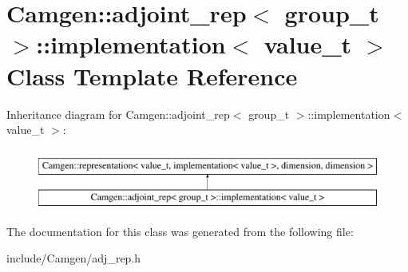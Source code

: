 \hypertarget{a00285}{}\section{Camgen\+:\+:adjoint\+\_\+rep$<$ group\+\_\+t $>$\+:\+:implementation$<$ value\+\_\+t $>$ Class Template Reference}
\label{a00285}
Inheritance diagram for Camgen\+:\+:adjoint\+\_\+rep$<$ group\+\_\+t $>$\+:\+:implementation$<$ value\+\_\+t $>$\+:\begin{figure}[H]
\begin{center}
\leavevmode
\includegraphics[height=2.000000cm]{a00285}
\end{center}
\end{figure}


The documentation for this class was generated from the following file\+:\begin{DoxyCompactItemize}
\item 
include/\+Camgen/adj\+\_\+rep.\+h\end{DoxyCompactItemize}
